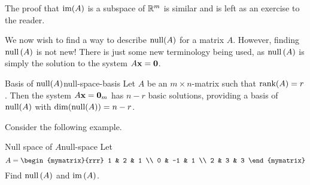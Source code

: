 The proof that $\mbox{\rm im}(A)$ is a subspace of $\mathbb{R}^m$ is similar and is left as an exercise to the reader. 

We now wish to find a way to describe $\mbox{\rm null}(A)$ for a matrix $A$. However, finding $\mbox{\rm null} \left(A\right)$ is not new! There is just some new
terminology being used, as $\mbox{\rm null} \left(A\right) $ is simply the solution
to the system $A\mbox{\bf x}=\mbox{\bf 0}$.

\begin{theorem}{Basis of $\mbox{\rm null}(A)$}{null-space-basis}
Let $A$ be an $m \times n$-matrix such that $\mbox{\rm rank}(A) = r$. Then the system $A\mbox{\bf x}=\mbox{\bf 0}_m$ has $n-r$ basic solutions, providing a basis of $\mbox{\rm null}(A)$ with $\dim(\mbox{\rm null}(A))=n-r$.
\end{theorem}

Consider the following example. 

\begin{example}{Null space of $A$}{null-space}
Let
\begin{equation*}
A=\begin{mymatrix}{rrr}
1 & 2 & 1 \\
0 & -1 & 1 \\
2 & 3 & 3
\end{mymatrix} 
\end{equation*}
Find $\mbox{\rm null} \left(A\right) $ and $\mbox{\rm im}\left(A\right)$.
\end{example}

